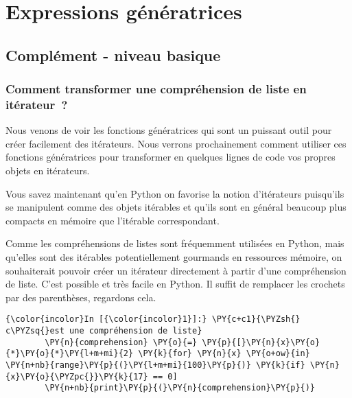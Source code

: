     
    
    
    

    

    \hypertarget{expressions-guxe9nuxe9ratrices}{%
\section{Expressions
génératrices}\label{expressions-guxe9nuxe9ratrices}}

    \hypertarget{compluxe9ment---niveau-basique}{%
\subsection{Complément - niveau
basique}\label{compluxe9ment---niveau-basique}}

    \hypertarget{comment-transformer-une-compruxe9hension-de-liste-en-ituxe9rateur}{%
\subsubsection{Comment transformer une compréhension de liste en
itérateur~?}\label{comment-transformer-une-compruxe9hension-de-liste-en-ituxe9rateur}}

    Nous venons de voir les fonctions génératrices qui sont un puissant
outil pour créer facilement des itérateurs. Nous verrons prochainement
comment utiliser ces fonctions génératrices pour transformer en quelques
lignes de code vos propres objets en itérateurs.

Vous savez maintenant qu'en Python on favorise la notion d'itérateurs
puisqu'ils se manipulent comme des objets itérables et qu'ils sont en
général beaucoup plus compacts en mémoire que l'itérable correspondant.

Comme les compréhensions de listes sont fréquemment utilisées en Python,
mais qu'elles sont des itérables potentiellement gourmands en ressources
mémoire, on souhaiterait pouvoir créer un itérateur directement à partir
d'une compréhension de liste. C'est possible et très facile en Python.
Il suffit de remplacer les crochets par des parenthèses, regardons cela.

    \begin{Verbatim}[commandchars=\\\{\}]
{\color{incolor}In [{\color{incolor}1}]:} \PY{c+c1}{\PYZsh{} c\PYZsq{}est une compréhension de liste}
        \PY{n}{comprehension} \PY{o}{=} \PY{p}{[}\PY{n}{x}\PY{o}{*}\PY{o}{*}\PY{l+m+mi}{2} \PY{k}{for} \PY{n}{x} \PY{o+ow}{in} \PY{n+nb}{range}\PY{p}{(}\PY{l+m+mi}{100}\PY{p}{)} \PY{k}{if} \PY{n}{x}\PY{o}{\PYZpc{}}\PY{k}{17} == 0] 
        \PY{n+nb}{print}\PY{p}{(}\PY{n}{comprehension}\PY{p}{)}
\end{Verbatim}


